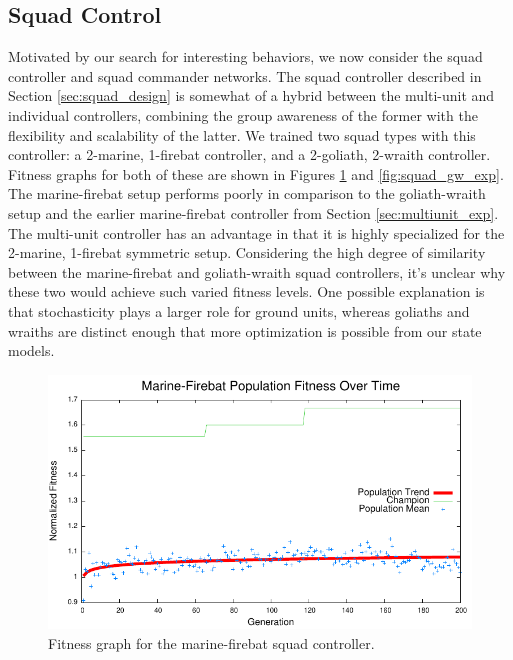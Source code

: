 \documentclass[10pt,a4paper,twocolumn]{article}
\begin{document}
\subsection{Squad Control}
\label{sec:squad_exp}

Motivated by our search for interesting behaviors, we now consider the squad controller and squad commander networks. The squad controller described in Section \ref{sec:squad_design} is somewhat of a hybrid between the multi-unit and individual controllers, combining the group awareness of the former with the flexibility and scalability of the latter. We trained two squad types with this controller: a 2-marine, 1-firebat controller, and a 2-goliath, 2-wraith controller. Fitness graphs for both of these are shown in Figures \ref{fig:squad_mf_exp} and \ref{fig:squad_gw_exp}. The marine-firebat setup performs poorly in comparison to the goliath-wraith setup and the earlier marine-firebat controller from Section \ref{sec:multiunit_exp}. The multi-unit controller has an advantage in that it is highly specialized for the 2-marine, 1-firebat symmetric setup. Considering the high degree of similarity between the marine-firebat and goliath-wraith squad controllers, it's unclear why these two would achieve such varied fitness levels. One possible explanation is that stochasticity plays a larger role for ground units, whereas goliaths and wraiths are distinct enough that more optimization is possible from our state models.

\begin{figure}[t]
\centering
\includegraphics[scale=.59]{plots/squad_mf.pdf}
\caption{Fitness graph for the marine-firebat squad controller.}
\label{fig:squad_mf_exp}
\end{figure}
\end{document}
